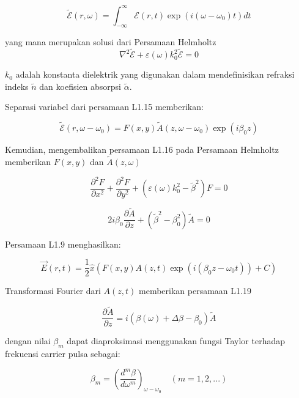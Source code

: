 \begin{equation}
    \tilde{\mathcal{E}}(r,\omega) = \int_{-\infty}^{\infty} \mathcal{E}(r,t) \exp(i(\omega-\omega_0)t)dt
\end{equation}

yang mana merupakan solusi dari Persamaan Helmholtz 
\begin{equation}
    \nabla^2\tilde{\mathcal{E}} + \varepsilon(\omega)k_0^2\tilde{\mathcal{E}} =0
\end{equation}

\(k_0\) adalah konstanta dielektrik yang digunakan dalam mendefinisikan refraksi indeks \(\tilde{n}\) dan koefisien absorpsi \(\tilde{\alpha}\).

Separasi variabel dari persamaan L1.15 memberikan: 

\begin{equation}
    \tilde{\mathcal{E}}(r,\omega-\omega_0) = F(x,y)\tilde{A}(z,\omega-\omega_0) \exp(i\beta_0z)
\end{equation}

Kemudian, mengembalikan persamaan L1.16 pada Persamaan Helmholtz memberikan \(F(x,y)\) dan \(\tilde{A}(z,\omega)\)

\begin{equation}
    \frac{\partial^2F}{\partial x^2} + \frac{\partial^2F}{\partial y^2} + (\varepsilon(\omega)k_0^2-\tilde{\beta}^2)F = 0
\end{equation}

\begin{equation}
    2i\beta_0 \frac{\partial \tilde{A}}{\partial z}+(\tilde{\beta}^2-\beta_0^2)\tilde{A} =0
\end{equation}

Persamaan L1.9 menghasilkan: 

\begin{equation}
    \vec{E}(r,t) = \frac{1}{2}\hat{x}(F(x,y)A(z,t)\exp(i(\beta_0z-\omega_0t))+C)
\end{equation}

Transformasi Fourier dari \(A(z,t)\) memberikan persamaan L1.19 

\begin{equation}
    \frac{\partial\tilde{A}}{\partial z} = i(\beta(\omega)+\Delta\beta-\beta_0)\tilde{A}
\end{equation}

dengan nilai \(\beta_m\) dapat diaproksimasi menggunakan fungsi Taylor terhadap frekuensi carrier pulsa sebagai: 

\begin{equation}
    \beta_m = (\frac{d^m\beta}{d\omega^m})_{\omega-\omega_0} \quad (m=1,2,...)
\end{equation}

